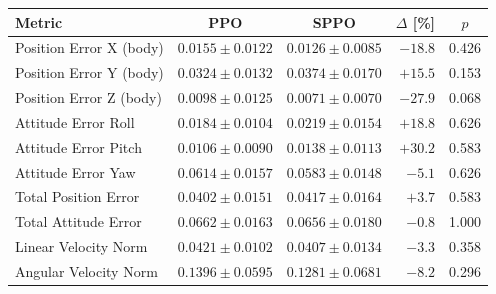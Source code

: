 \begin{tabular}{lccrc}
\toprule
Metric & PPO & SPPO & $\Delta$ [\%] & $p$ \\
\midrule
Position Error X (body) & $0.0155 \pm 0.0122$ & $0.0126 \pm 0.0085$ & $-18.8$ & 0.426 \\
Position Error Y (body) & $0.0324 \pm 0.0132$ & $0.0374 \pm 0.0170$ & $+15.5$ & 0.153 \\
Position Error Z (body) & $0.0098 \pm 0.0125$ & $0.0071 \pm 0.0070$ & $-27.9$ & 0.068 \\
Attitude Error Roll & $0.0184 \pm 0.0104$ & $0.0219 \pm 0.0154$ & $+18.8$ & 0.626 \\
Attitude Error Pitch & $0.0106 \pm 0.0090$ & $0.0138 \pm 0.0113$ & $+30.2$ & 0.583 \\
Attitude Error Yaw & $0.0614 \pm 0.0157$ & $0.0583 \pm 0.0148$ & $-5.1$ & 0.626 \\
Total Position Error & $0.0402 \pm 0.0151$ & $0.0417 \pm 0.0164$ & $+3.7$ & 0.583 \\
Total Attitude Error & $0.0662 \pm 0.0163$ & $0.0656 \pm 0.0180$ & $-0.8$ & 1.000 \\
Linear Velocity Norm & $0.0421 \pm 0.0102$ & $0.0407 \pm 0.0134$ & $-3.3$ & 0.358 \\
Angular Velocity Norm & $0.1396 \pm 0.0595$ & $0.1281 \pm 0.0681$ & $-8.2$ & 0.296 \\
\bottomrule
\end{tabular}

